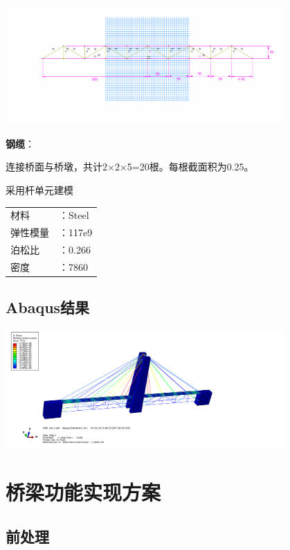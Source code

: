 \documentclass[UTF8]{ctexbook}
\begin{document}
\includegraphics[width=0.8\textwidth]{04.png}

\textbf{钢缆}：

连接桥面与桥墩，共计2×2×5=20根。每根截面积为0.25。

采用杆单元建模

\begin{center}
\begin{tabular}{ll}
材料&：Steel\\
弹性模量&：117e9\\
泊松比&：0.266\\
密度&：7860\\
\end{tabular}
\end{center}

\subsection{Abaqus结果}
\includegraphics[width=0.8\textwidth]{05.png}


\section{桥梁功能实现方案}
\subsection{前处理}

\end{document}
